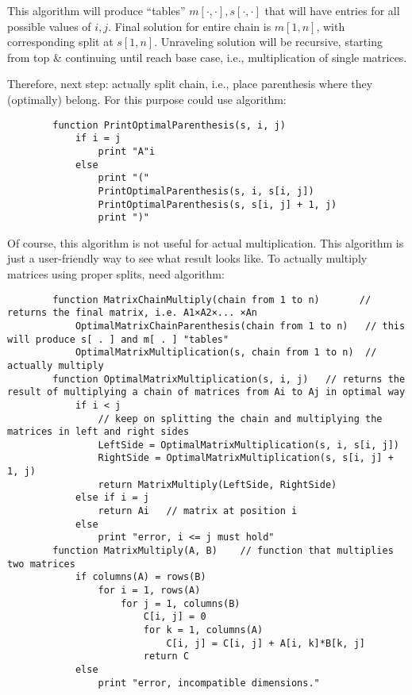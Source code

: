\documentclass{article}
\begin{document}
\begin{enumerate}
	This algorithm will produce ``tables'' $m[\cdot,\cdot],s[\cdot,\cdot]$ that will have entries for all possible values of $i,j$. Final solution for entire chain is $m[1,n]$, with corresponding split at $s[1,n]$. Unraveling solution will be recursive, starting from top \& continuing until reach base case, i.e., multiplication of single matrices.
	
	Therefore, next step: actually split chain, i.e., place parenthesis where they (optimally) belong. For this purpose could use algorithm:
	\begin{verbatim}
		function PrintOptimalParenthesis(s, i, j)
		    if i = j
		        print "A"i
		    else
		        print "(" 
		        PrintOptimalParenthesis(s, i, s[i, j]) 
		        PrintOptimalParenthesis(s, s[i, j] + 1, j) 
		        print ")"
	\end{verbatim}
	Of course, this algorithm is not useful for actual multiplication. This algorithm is just a user-friendly way to see what result looks like. To actually multiply matrices using proper splits, need algorithm:
	\begin{verbatim}
		function MatrixChainMultiply(chain from 1 to n)       // returns the final matrix, i.e. A1×A2×... ×An
		    OptimalMatrixChainParenthesis(chain from 1 to n)   // this will produce s[ . ] and m[ . ] "tables"
		    OptimalMatrixMultiplication(s, chain from 1 to n)  // actually multiply
		function OptimalMatrixMultiplication(s, i, j)   // returns the result of multiplying a chain of matrices from Ai to Aj in optimal way
		    if i < j
		        // keep on splitting the chain and multiplying the matrices in left and right sides
		        LeftSide = OptimalMatrixMultiplication(s, i, s[i, j])
		        RightSide = OptimalMatrixMultiplication(s, s[i, j] + 1, j)
		        return MatrixMultiply(LeftSide, RightSide)
		    else if i = j
		        return Ai   // matrix at position i
		    else
		        print "error, i <= j must hold"
	    function MatrixMultiply(A, B)    // function that multiplies two matrices
	        if columns(A) = rows(B)
	            for i = 1, rows(A)
	                for j = 1, columns(B)
	                    C[i, j] = 0
	                    for k = 1, columns(A)
	                        C[i, j] = C[i, j] + A[i, k]*B[k, j]
	                    return C
	        else
	            print "error, incompatible dimensions."
	\end{verbatim}
\end{enumerate}
\end{document}
